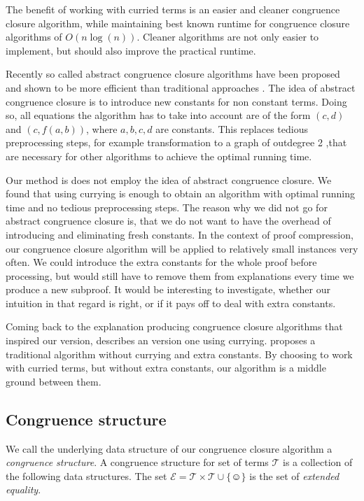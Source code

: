 The benefit of working with curried terms is an easier and cleaner congruence closure algorithm, while maintaining best known runtime for congruence closure algorithms of $O(n \log(n))$.
Cleaner algorithms are not only easier to implement, but should also improve the practical runtime.

Recently so called abstract congruence closure algorithms have been proposed and shown to be more efficient than traditional approaches \cite{Bachmair2000}.
The idea of abstract congruence closure is to introduce new constants for non constant terms.
Doing so, all equations the algorithm has to take into account are of the form $(c,d)$ and $(c, f(a,b))$, where $a,b,c,d$ are constants.
This replaces tedious preprocessing steps, for example transformation to a graph of outdegree 2 \cite{Downey1980},that are necessary for other algorithms to achieve the optimal running time.

Our method is does not employ the idea of abstract congruence closure.
We found that using currying is enough to obtain an algorithm with optimal running time and no tedious preprocessing steps.
The reason why we did not go for abstract congruence closure is, that we do not want to have the overhead of introducing and eliminating fresh constants.
In the context of proof compression, our congruence closure algorithm will be applied to relatively small instances very often.
We could introduce the extra constants for the whole proof before processing, but would still have to remove them from explanations every time we produce a new subproof.
It would be interesting to investigate, whether our intuition in that regard is right, or if it pays off to deal with extra constants.

Coming back to the explanation producing congruence closure algorithms that inspired our version, \cite{Nieuwenhuis2005,Nieuwenhuis2007} describes an version one using currying.
\cite{Fontaine2004} proposes a traditional algorithm without currying and extra constants.
By choosing to work with curried terms, but without extra constants, our algorithm is a middle ground between them.

\subsection*{Congruence structure}

We call the underlying data structure of our congruence closure algorithm a \emph{congruence structure}.
A congruence structure for set of terms $\mathcal{T}$ is a collection of the following data structures.
The set $\mathcal{E} = \mathcal{T} \times \mathcal{T} \cup \{\smiley\}$ is the set of \emph{extended equality}.

